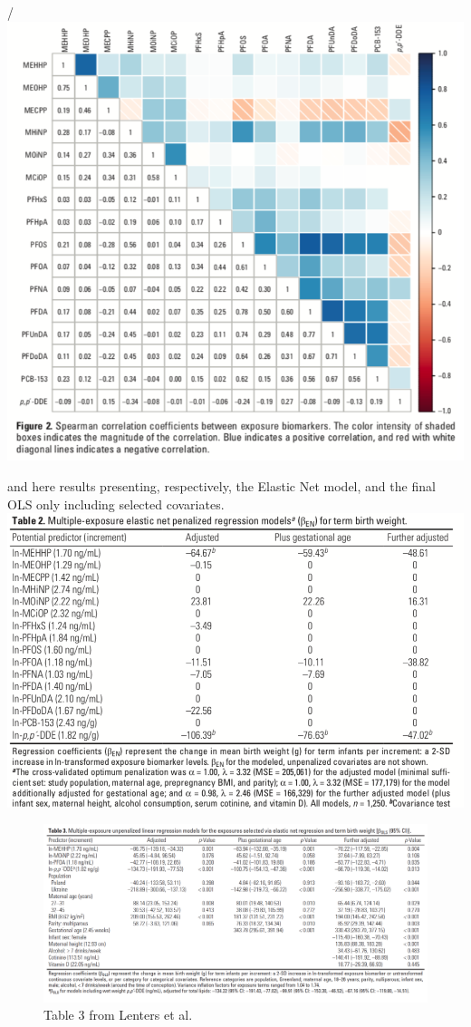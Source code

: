 \documentclass[
]{book}
\begin{document}
/\includegraphics{images/corrplot.png}

and here results presenting, respectively, the Elastic Net model, and the final OLS only including selected covariates.
\includegraphics{images/table2.png}

\begin{figure}
\centering
\includegraphics{images/table3.png}
\caption{Table 3 from Lenters et al.}
\end{figure}
\end{document}
